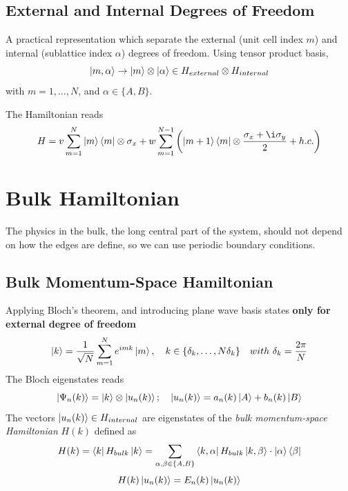 \subsection{External and Internal Degrees of Freedom}\label{sec:1.1.1}
A practical representation which separate the external (unit cell index $m$) and internal (sublattice index $\alpha$) degrees of freedom.
Using tensor product basis,
\begin{equation}
    \ket{m,\alpha} \to \ket{m} \otimes \ket{\alpha} \in H_{external} \otimes H_{internal}
    \label{eq:1.3}
\end{equation}
with $m=1, \dots, N$, and $\alpha \in \lbrace A, B\rbrace$.

The Hamiltonian reads
\begin{equation}
    H = v \sum_{m=1}^N \ket{m}\bra{m} \otimes \sigma_x + w \sum_{m=1}^{N-1} \left( \ket{m+1}\bra{m} \otimes \frac{\sigma_x + \i\sigma_y}{2} + h.c. \right)
    \label{eq:1.5}
\end{equation}

\section{Bulk Hamiltonian}\label{sec:1.2}
The physics in the bulk, the long central part of the system, should not depend on how the edges are define, so we can use periodic boundary conditions.

\subsection{Bulk Momentum-Space Hamiltonian}\label{sec:1.2.1}
Applying Bloch's theorem, and introducing plane wave basis states \textbf{only for external degree of freedom}
\begin{equation}
    \ket{k} = \frac{1}{\sqrt{N}} \sum_{m=1}^N e^{imk} \ket{m}, ~ ~ ~ k\in \lbrace \delta_k, \dots, N\delta_k \rbrace ~ ~ ~with~  \delta_k = \frac{2\pi}{N}
    \label{eq:1.8}
\end{equation}
The Bloch eigenstates reads
\begin{equation}
    \ket{\Psi_n(k)} = \ket{k} \otimes \ket{u_n(k)};~ ~ ~ \ket{u_n(k)} = a_n(k) \ket{A} + b_n(k) \ket{B}
    \label{eq:1.9}
\end{equation}
The vectors $\ket{u_n(k)} \in H_{internal}$ are eigenstates of the \textit{bulk momentum-space Hamiltonian} $H(k)$ defined as
\begin{equation}
    H(k) = \bra{k} H_{bulk} \ket{k} = \sum_{\alpha,\beta\in \lbrace A,B \rbrace} \bra{k,\alpha} H_{bulk} \ket{k,\beta} \cdot \ket{\alpha} \bra{\beta}
    \label{eq:1.10}
\end{equation}
\begin{equation}
    H(k) \ket{u_n(k)} = E_n(k) \ket{u_n(k)}
    \label{eq:1.11}
\end{equation}

